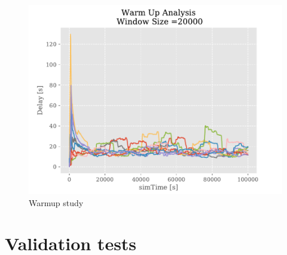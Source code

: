 \documentclass[a4paper,12pt]{article}
\begin{document}
\begin{figure}[H]
  \centering
  \includegraphics[scale=0.6]{img/warmup-study.pdf}
  \caption{Warmup study}
  \label{fig:warmup-study}
\end{figure}

\section{Validation tests}
\end{document}
